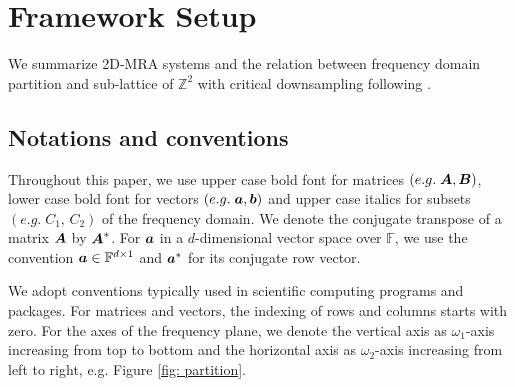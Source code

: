\section{Framework Setup}\label{sec: setup}
We summarize 2D-MRA systems and the relation between frequency domain partition and sub-lattice of $\mathbb{Z}^2$ with critical downsampling following \cite{yin2014orthshear}.

\subsection{Notations and conventions}
Throughout this paper, we use upper case bold font for matrices $(e.g.\;\boldsymbol{A},\boldsymbol{B})$, lower case bold font for vectors $(e.g.\;\boldsymbol{a},\boldsymbol{b})$ and upper case italics for subsets $(e.g.\;C_1,\,C_2)$ of the frequency domain. We denote the conjugate transpose of a matrix $\boldsymbol{A}$ by $\boldsymbol{A}^*$. For $\boldsymbol{a}$ in a $d$-dimensional vector space over $\mathbb{F}$, we use the convention $\boldsymbol{a}\in\mathbb{F}^{d\times 1}$ and $\boldsymbol{a}^*$ for its conjugate row vector. 

We adopt conventions typically used in scientific computing programs and packages. For matrices and vectors, the indexing of rows and columns starts with zero. For the axes of the frequency plane, we denote the vertical axis as $\omega_1$-axis increasing from top to bottom and the horizontal axis as $\omega_2$-axis increasing from left to right, e.g. Figure \ref{fig: partition}.

